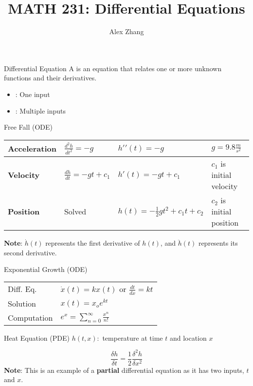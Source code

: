 \documentclass[12pt]{report}
\title{MATH 231: Differential Equations}
\author{Alex Zhang}
\begin{document}
\maketitle
\tableofcontents
\newpage

\renewcommand{\arraystretch}{1.5}
\chapter{}

\begin{dfnbox}{Differential Equation}
	A  is an equation that relates one or more unknown functions and their derivatives.

	\begin{itemize}
		\item {}: One input
		\item {}: Multiple inputs
	\end{itemize}
\end{dfnbox}

\begin{exbox}{Free Fall (ODE)}
	\begin{tabularx}{\linewidth}{|l|l|l|l|} \hline
		\textbf{Acceleration} & $\frac{d^2h}{dt^2}=-g$ & $h\prime \prime(t)=-g$ & $g=9.8\frac{\unit{m}}{\unit{s}^2}$ \\ \hline
		\textbf{Velocity} & $\frac{dh}{dt}=-gt+c_1$ & $h\prime (t)=-gt+c_1$ & $c_1$ is initial velocity \\ \hline
		\textbf{Position} & Solved & $h(t)=-\frac{1}{2}gt^2+c_1t+c_2$ & $c_2$ is initial position \\ \hline
	\end{tabularx}
	\tcblower
	\textbf{Note}: $\dot{h}(t)$ represents the first derivative of $h(t)$, and $\ddot{h}(t)$ represents its second derivative.
\end{exbox}

\begin{exbox}{Exponential Growth (ODE)}
	\begin{tabular}{l l}
		Diff. Eq. & $\dot{x}(t)=kx(t)$ or $\frac{dt}{dx}=kt$\\
		Solution & $x(t)=x_oe^{kt}$ \\
		Computation & $e^x = \sum_{n=0}^{\infty}\frac{x^n}{n!}$
	\end{tabular}
\end{exbox}

\begin{exbox}{Heat Equation (PDE)}
	$h(t,x) : $ temperature at time $t$ and location $x$

	$$\frac{\delta h}{\delta t} = \frac12 \frac{\delta^2 h}{\delta x^2}$$
	\tcblower
	\textbf{Note}: This is an example of a \textbf{partial} differential equation as it has two inputs, $t$ and $x$.
\end{exbox}
\end{document}
